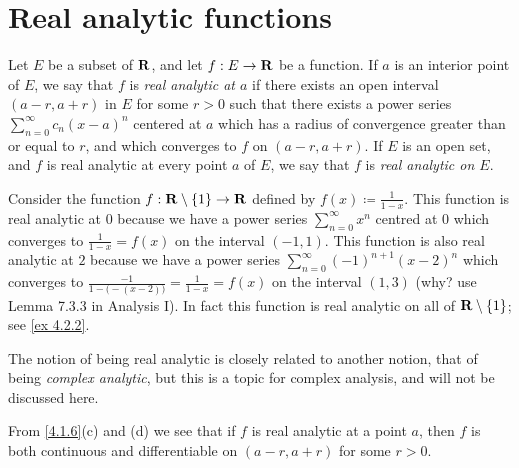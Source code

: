 \section{Real analytic functions}\label{sec 4.2}

\begin{definition}\label{4.2.1}
  Let \(E\) be a subset of \(\mathbf{R}\), and let \(f : E \to \mathbf{R}\) be a function.
  If \(a\) is an interior point of \(E\), we say that \(f\) is \emph{real analytic at \(a\)} if there exists an open interval \((a - r, a + r)\) in \(E\) for some \(r > 0\) such that there exists a power series \(\sum_{n = 0}^\infty c_n (x - a)^n\) centered at \(a\) which has a radius of convergence greater than or equal to \(r\), and which converges to \(f\) on \((a - r, a + r)\).
  If \(E\) is an open set, and \(f\) is real analytic at every point \(a\) of \(E\), we say that \(f\) is \emph{real analytic on \(E\)}.
\end{definition}

\begin{example}\label{4.2.2}
  Consider the function \(f : \mathbf{R} \setminus \{1\} \to \mathbf{R}\) defined by \(f(x) \coloneqq \frac{1}{1 - x}\).
  This function is real analytic at \(0\) because we have a power series \(\sum_{n = 0}^\infty x^n\) centred at \(0\) which converges to \(\frac{1}{1 - x} = f(x)\) on the interval \((-1, 1)\).
  This function is also real analytic at \(2\) because we have a power series \(\sum_{n = 0}^\infty (-1)^{n + 1} (x - 2)^n\) which converges to \(\frac{-1}{1 - \big(-(x - 2)\big)} = \frac{1}{1 - x} = f(x)\) on the interval \((1, 3)\)
  (why? use Lemma 7.3.3 in Analysis I).
  In fact this function is real analytic on all of \(\mathbf{R} \setminus \{1\}\);
  see \cref{ex 4.2.2}.
\end{example}

\begin{remark}\label{4.2.3}
  The notion of being real analytic is closely related to another notion, that of being \emph{complex analytic}, but this is a topic for complex analysis, and will not be discussed here.
\end{remark}

\begin{note}
  From \cref{4.1.6}(c) and (d) we see that if \(f\) is real analytic at a point \(a\), then \(f\) is both continuous and diﬀerentiable on \((a - r, a + r)\) for some \(r > 0\).
\end{note}

